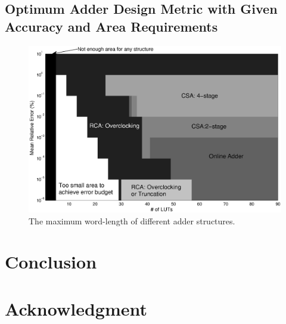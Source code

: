 \documentclass[10pt, conference, compsocconf]{IEEEtran}
\begin{document}
\subsection{Optimum Adder Design Metric with Given Accuracy and Area Requirements}
%
\begin{figure}[tbp]
  \centering
  \includegraphics[width=.8\textwidth]{./figures/exp/3d_ErrorArea.eps}
  \caption{The maximum word-length of different adder structures.}
  \label{Fig:adder_3d_ErrorArea}
\end{figure}

\section{Conclusion}

\section*{Acknowledgment}





\end{document}
